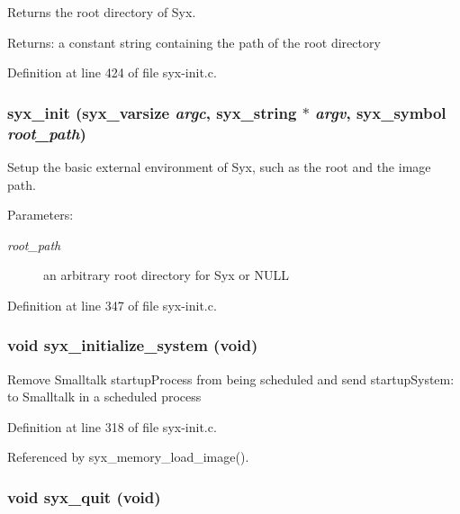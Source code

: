 Returns the root directory of Syx.

\begin{Desc}
\item[Returns:]a constant string containing the path of the root directory \end{Desc}


Definition at line 424 of file syx-init.c.\hypertarget{syx-init_8c_890a4fe6fc8c8b546c995f03fb19d67d}{
\subsubsection{ syx\_\-init ({\bf syx\_\-varsize} {\em argc}, \/  {\bf syx\_\-string} $\ast$ {\em argv}, \/  {\bf syx\_\-symbol} {\em root\_\-path})}}
\label{syx-init_8c_890a4fe6fc8c8b546c995f03fb19d67d}


Setup the basic external environment of Syx, such as the root and the image path.

\begin{Desc}
\item[Parameters:]
\begin{description}
\item[{\em root\_\-path}]an arbitrary root directory for Syx or NULL \end{description}
\end{Desc}


Definition at line 347 of file syx-init.c.\hypertarget{syx-init_8c_f7b7206eb53c182199d80bb08e014990}{
\subsubsection{\setlength{\rightskip}{0pt plus 5cm}void syx\_\-initialize\_\-system (void)}}
\label{syx-init_8c_f7b7206eb53c182199d80bb08e014990}


Remove Smalltalk startupProcess from being scheduled and send startupSystem: to Smalltalk in a scheduled process 

Definition at line 318 of file syx-init.c.

Referenced by syx\_\-memory\_\-load\_\-image().\hypertarget{syx-init_8c_22715c2da20aedb6ef06b32053dc8a80}{
\subsubsection{\setlength{\rightskip}{0pt plus 5cm}void syx\_\-quit (void)}}
\label{syx-init_8c_22715c2da20aedb6ef06b32053dc8a80}


